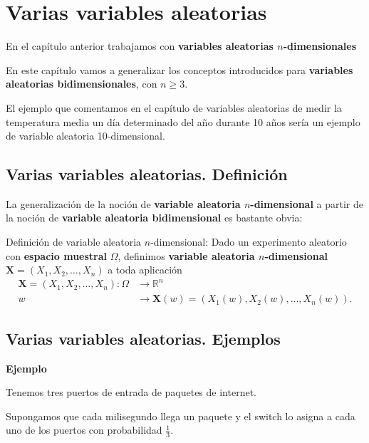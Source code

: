 \documentclass[]{book}
\begin{document}
\hypertarget{varias-variables-aleatorias}{%
\section{Varias variables aleatorias}\label{varias-variables-aleatorias}}

En el capítulo anterior trabajamos con \textbf{variables aleatorias \(n\)-dimensionales}

En este capítulo vamos a generalizar los conceptos introducidos para \textbf{variables aleatorias bidimensionales}, con \(n\geq 3\).

El ejemplo que comentamos en el capítulo de variables aleatorias de medir la temperatura media un día determinado del año durante 10 años sería un ejemplo de variable aleatoria 10-dimensional.

\hypertarget{varias-variables-aleatorias.-definiciuxf3n}{%
\subsection{Varias variables aleatorias. Definición}\label{varias-variables-aleatorias.-definiciuxf3n}}

La generalización de la noción de \textbf{variable aleatoria \(n\)-dimensional} a partir de la noción de \textbf{variable aleatoria bidimensional} es bastante obvia:

Definición de variable aleatoria \(n\)-dimensional:
Dado un experimento aleatorio con \textbf{espacio muestral} \(\Omega\), definimos \textbf{variable aleatoria \(n\)-dimensional} \(\mathbf{X}=(X_1,X_2,\ldots,X_n)\) a toda aplicación
\[
\begin{array}{rl}
\mathbf{X}=(X_1,X_2,\ldots,X_n): \Omega & \longrightarrow \mathbb{R}^n\\
w & \longrightarrow \mathbf{X}(w)=(X_1(w),X_2(w),\ldots,X_n(w)).
\end{array}
\]

\hypertarget{varias-variables-aleatorias.-ejemplos}{%
\subsection{Varias variables aleatorias. Ejemplos}\label{varias-variables-aleatorias.-ejemplos}}

\textbf{Ejemplo}

Tenemos tres puertos de entrada de paquetes de internet.

Supongamos que cada milisegundo llega un paquete y el switch lo asigna a cada uno de los puertos con probabilidad \(\frac{1}{3}\).
\end{document}
